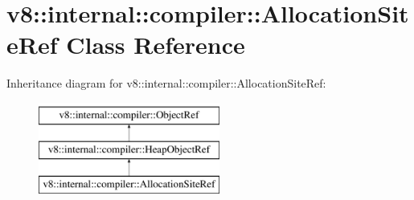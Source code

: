 \hypertarget{classv8_1_1internal_1_1compiler_1_1AllocationSiteRef}{}\section{v8\+:\+:internal\+:\+:compiler\+:\+:Allocation\+Site\+Ref Class Reference}
\label{classv8_1_1internal_1_1compiler_1_1AllocationSiteRef}
Inheritance diagram for v8\+:\+:internal\+:\+:compiler\+:\+:Allocation\+Site\+Ref\+:\begin{figure}[H]
\begin{center}
\leavevmode
\includegraphics[height=3.000000cm]{classv8_1_1internal_1_1compiler_1_1AllocationSiteRef}
\end{center}
\end{figure}
